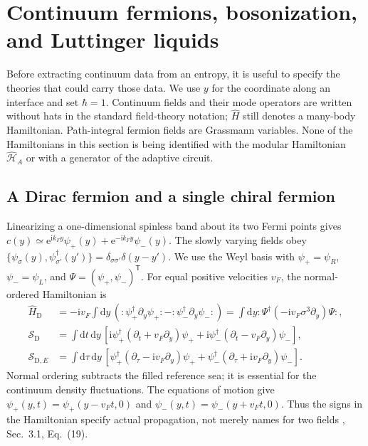 \documentclass[aps,prb,onecolumn,nofootinbib,superscriptaddress]{revtex4-2}
\newcommand{\dd}{\mathrm{d}}
\newcommand{\ii}{\mathrm{i}}
\newcommand{\e}{\mathrm{e}}
\begin{document}
\section{Continuum fermions, bosonization, and Luttinger liquids}
\label{sec:continuum-models}
Before extracting continuum data from an entropy, it is useful to specify
the theories that could carry those data. We use $y$ for the coordinate
along an interface and set $\hbar=1$. Continuum fields and their mode
operators are written without hats in the standard field-theory notation;
$\hat H$ still denotes a many-body Hamiltonian. Path-integral fermion
fields are Grassmann variables. None of the Hamiltonians in this section
is being identified with the modular Hamiltonian
$\hat{\mathcal H}_A$ or with a generator of the adaptive circuit.

\subsection{A Dirac fermion and a single chiral fermion}
Linearizing a one-dimensional spinless band about its two Fermi points
gives $c(y)\simeq\e^{\ii k_Fy}\psi_+(y)+\e^{-\ii k_Fy}\psi_-(y)$.
The slowly varying fields obey
$\{\psi_\sigma(y),\psi_{\sigma'}^\dagger(y')\}
=\delta_{\sigma\sigma'}\delta(y-y')$. We use the Weyl basis with
$\psi_+=\psi_R$,
$\psi_-=\psi_L$, and $\Psi=(\psi_+,\psi_-)^{\mathsf T}$.
For equal positive velocities $v_F$, the normal-ordered Hamiltonian is
\begin{align}
 \hat H_{\mathrm D}
 &=-\ii v_F\int\dd y\,
       \left(:\!\psi_+^\dagger\partial_y\psi_+\!:
             -:\!\psi_-^\dagger\partial_y\psi_-\!:\right)
 =\int\dd y:\!\Psi^\dagger(-\ii v_F\sigma^3\partial_y)\Psi\!:,
 \label{eq:dirac-hamiltonian}\\
 \mathcal S_{\mathrm D}
 &=\int\dd t\,\dd y\,
    \left[\ii\psi_+^\dagger(\partial_t+v_F\partial_y)\psi_+
         +\ii\psi_-^\dagger(\partial_t-v_F\partial_y)\psi_-\right],
 \label{eq:dirac-action}\\
 \mathcal S_{\mathrm D,E}
 &=\int\dd\tau\,\dd y\,
    \left[\psi_+^\dagger(\partial_\tau-\ii v_F\partial_y)\psi_+
         +\psi_-^\dagger(\partial_\tau+\ii v_F\partial_y)\psi_-\right].
 \label{eq:dirac-euclidean}
\end{align}
Normal ordering subtracts the filled reference sea; it is essential for
the continuum density fluctuations. The equations of motion give
$\psi_+(y,t)=\psi_+(y-v_Ft,0)$ and
$\psi_-(y,t)=\psi_-(y+v_Ft,0)$. Thus the signs in the Hamiltonian
specify actual propagation, not merely names for two fields
\cite{Senechal1999}, Sec.~3.1, Eq.~(19).
\end{document}
